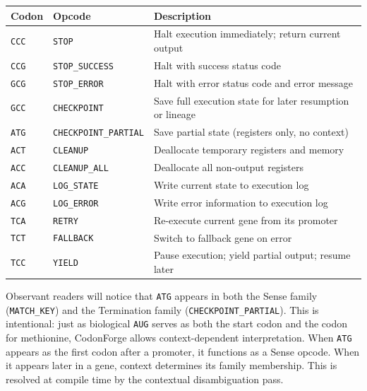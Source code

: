 \begin{center}
\renewcommand{\arraystretch}{1.1}
\small
\begin{tabularx}{0.97\textwidth}{L{1.2cm} L{3cm} Y}
\toprule
\textbf{Codon} & \textbf{Opcode} & \textbf{Description} \\
\midrule
\texttt{CCC} & \texttt{STOP} & Halt execution immediately; return current output \\
\texttt{CCG} & \texttt{STOP\_SUCCESS} & Halt with success status code \\
\texttt{GCG} & \texttt{STOP\_ERROR} & Halt with error status code and error message \\
\texttt{GCC} & \texttt{CHECKPOINT} & Save full execution state for later resumption or lineage \\
\texttt{ATG} & \texttt{CHECKPOINT\_PARTIAL} & Save partial state (registers only, no context) \\
\texttt{ACT} & \texttt{CLEANUP} & Deallocate temporary registers and memory \\
\texttt{ACC} & \texttt{CLEANUP\_ALL} & Deallocate all non-output registers \\
\texttt{ACA} & \texttt{LOG\_STATE} & Write current state to execution log \\
\texttt{ACG} & \texttt{LOG\_ERROR} & Write error information to execution log \\
\texttt{TCA} & \texttt{RETRY} & Re-execute current gene from its promoter \\
\texttt{TCT} & \texttt{FALLBACK} & Switch to fallback gene on error \\
\texttt{TCC} & \texttt{YIELD} & Pause execution; yield partial output; resume later \\
\bottomrule
\end{tabularx}
\end{center}

\begin{implnote}
Observant readers will notice that \texttt{ATG} appears in both the Sense family (\texttt{MATCH\_KEY}) and the Termination family (\texttt{CHECKPOINT\_PARTIAL}). This is intentional: just as biological \texttt{AUG} serves as both the start codon and the codon for methionine, CodonForge allows context-dependent interpretation. When \texttt{ATG} appears as the first codon after a promoter, it functions as a Sense opcode. When it appears later in a gene, context determines its family membership. This is resolved at compile time by the contextual disambiguation pass.
\end{implnote}

